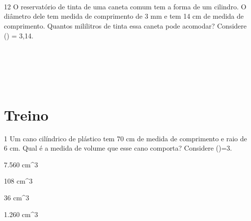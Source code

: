 \\
\\
\\

\num{12} O reservatório de tinta de uma caneta comum tem a forma de um
cilindro. O diâmetro dele tem medida de comprimento de 3 mm e tem 14 cm
de medida de comprimento. Quantos mililitros de tinta essa caneta pode
acomodar? Considere (\Pi) = 3,14.

\\
\\
\\
\\

\section{Treino}

\num{1} Um cano cilíndrico de plástico tem 70 cm de medida de comprimento e
raio de 6 cm. Qual é a medida de volume que esse cano comporta?
Considere (\Pi)=3.
\item 7.560 cm^3
\item 108 cm^3
\item 36 cm^3
\item 1.260 cm^3










